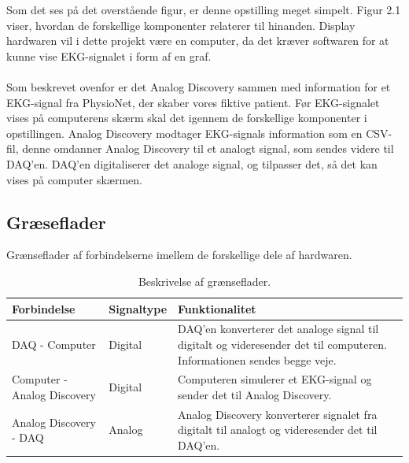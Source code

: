 Som det ses på det overstående figur, er denne opstilling meget simpelt. Figur 2.1 viser, hvordan de forskellige komponenter relaterer til hinanden. Display hardwaren vil i dette projekt være en computer, da det kræver softwaren for at kunne vise EKG-signalet i form af en graf.
\\
\\  
Som beskrevet ovenfor er det Analog Discovery sammen med information for et EKG-signal fra PhysioNet, der skaber vores fiktive patient. Før EKG-signalet vises på computerens skærm skal det igennem de forskellige komponenter i opstillingen. Analog Discovery modtager EKG-signals  information som en CSV-fil, denne omdanner Analog Discovery til et analogt signal, som sendes videre til DAQ’en. DAQ’en digitaliserer det analoge signal, og tilpasser det, så det kan vises på computer skærmen. 

\subsection{Græseflader}
Grænseflader af forbindelserne imellem de forskellige dele af hardwaren. 

\begin{table}[H] 
	\begin{tabularx}{\textwidth}{l l X}
    \toprule
     \textbf{Forbindelse}   & \textbf{Signaltype} & \textbf{Funktionalitet}    \\ \midrule
     DAQ - Computer         & Digital & DAQ'en konverterer det analoge signal til digitalt og videresender det til 							  computeren. Informationen sendes begge veje. \\ 
     					      \addlinespace[2mm]                                                                                                                                                                            
     Computer - Analog Discovery			& Digital & Computeren simulerer et EKG-signal og sender det til Analog Discovery.\\ 
     				    	  \addlinespace[2mm]   				                                                                                                                                                                           
     Analog Discovery - DAQ			   	& Analog & Analog Discovery	 konverterer signalet fra digitalt til analogt og videresender det til 							      DAQ'en.\\  				      
    \bottomrule                                                                                                                   
    \end{tabularx}
    \caption {Beskrivelse af grænseflader.}
    \label{tab:graenseflader}
\end{table}



